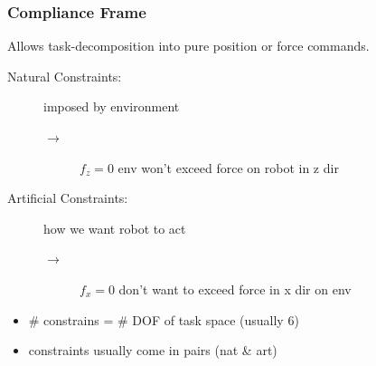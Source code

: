     \subsubsection{Compliance Frame}
        Allows task-decomposition into pure position or force commands.
        \begin{center}
        \end{center}
        \begin{description}
            \item[Natural Constraints:] imposed by environment
                \begin{description}
                    \item[$\to$]  $f_z=0$ env won't exceed force on robot in z dir
                \end{description}
            \item[Artificial Constraints:] how we want robot to act  
                \begin{description}
                    \item[$\to$]  $f_x=0$ don't want to exceed force in x dir on env
                \end{description}
        \end{description}
        \vspace{1em}
        \begin{itemize}
            \item \# constrains = \# DOF of task space (usually 6)
            \item constraints usually come in pairs (nat \& art)
        \end{itemize}
           
